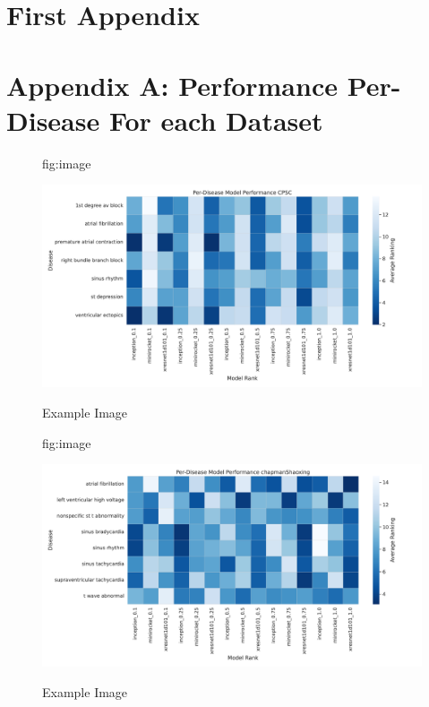 \documentclass[pmlr,twocolumn]{jmlr}%
\begin{document}
\label{sec:scaling}


\section{First Appendix}\label{apd:first}



\section{Appendix A: Performance Per-Disease For each Dataset}\label{apd:first}

\begin{figure}[tbp]
\floatconts
  {fig:image}
  {\caption{Example Image}}
  {\includegraphics[width=1\linewidth]{images/Per-Disease_Model_Performance_cpsc.pdf}}
\end{figure}

\begin{figure}[tbp]
\floatconts
  {fig:image}
  {\caption{Example Image}}
  {\includegraphics[width=1\linewidth]{images/Per-Disease_Model_Performance_chapmanShaoxing.pdf}}
\end{figure}
\end{document}
